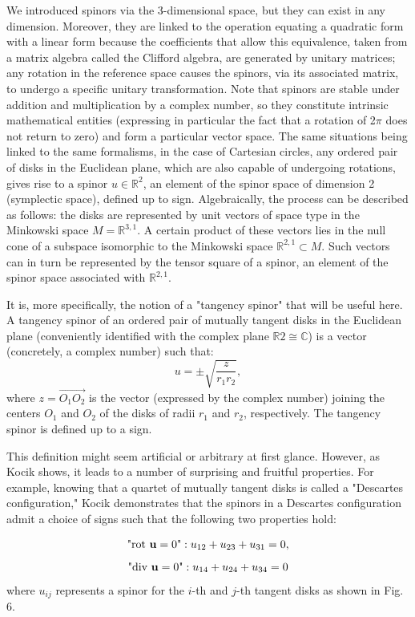 \documentclass[12pt]{article}
\theoremstyle{définition}
\theoremstyle{remark}
\theoremstyle{plain}
\theoremstyle{plain}
\begin{document}
We introduced spinors via the 3-dimensional space, but they can exist in any dimension. Moreover, they are linked to the operation equating a quadratic form with a linear form because the coefficients that allow this equivalence, taken from a matrix algebra called the Clifford algebra, are generated by unitary matrices; any rotation in the reference space causes the spinors, via its associated matrix, to undergo a specific unitary transformation. Note that spinors are stable under addition and multiplication by a complex number, so they constitute intrinsic mathematical entities (expressing in particular the fact that a rotation of 2$\pi$ does not return to zero) and form a particular vector space. The same situations being linked to the same formalisms, in the case of Cartesian circles, any ordered pair of disks in the Euclidean plane, which are also capable of undergoing rotations, gives rise to a spinor $u \in \mathbb{R}^2$, an element of the spinor space of dimension 2 (symplectic space), defined up to sign. Algebraically, the process can be described as follows: the disks are represented by unit vectors of space type in the Minkowski space $M = \mathbb{R}^{3,1}$. A certain product of these vectors lies in the null cone of a subspace isomorphic to the Minkowski space $\mathbb{R}^{2,1} \subset M$. Such vectors can in turn be represented by the tensor square of a spinor, an element of the spinor space associated with $\mathbb{R}^{2,1}$.

It is, more specifically, the notion of a "tangency spinor" that will be useful here. A tangency spinor of an ordered pair of mutually tangent disks in the Euclidean plane (conveniently identified with the complex plane $\mathbb{R}2 \cong \mathbb{C}$) is a vector (concretely, a complex number) such that:
\[
u = \pm\sqrt{\frac{z}{r_1r_2}},
\]
where $z = \overrightarrow{O_1O_2}$ is the vector (expressed by the complex number) joining the centers $O_1$ and $O_2$ of the disks of radii $r_1$ and $r_2$, respectively. The tangency spinor is defined up to a sign.

This definition might seem artificial or arbitrary at first glance. However, as Kocik shows, it leads to a number of surprising and fruitful properties. For example, knowing that a quartet of mutually tangent disks is called a "Descartes configuration," Kocik demonstrates that the spinors in a Descartes configuration admit a choice of signs such that the following two properties hold:

\begin{equation}
\textnormal{"rot}\ \mathbf{u}=0\textnormal{"} : u_{12} + u_{23} + u_{31} = 0,
\end{equation}
\begin{equation}
\textnormal{"div}\ \mathbf{u} = 0\textnormal{"} : u_{14} + u_{24} + u_{34} = 0
\end{equation}
where $u_{i j}$ represents a spinor for the $i$-th and $j$-th tangent disks as shown in Fig. 6.
\end{document}
